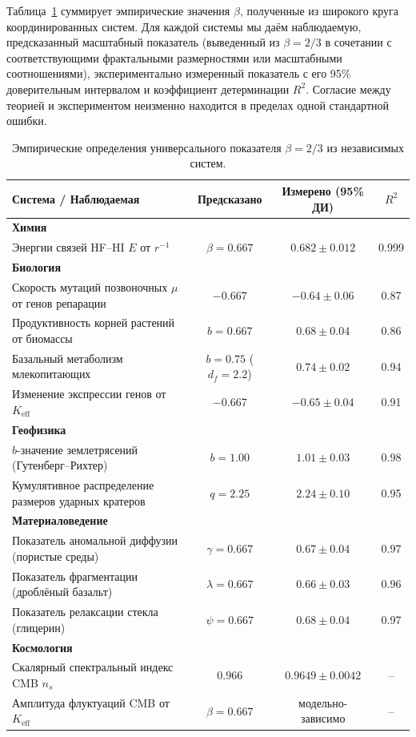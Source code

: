 \documentclass[11pt,a4paper]{article}
\begin{document}
	Таблица~\ref{tab:empirical-beta} суммирует эмпирические значения \(\beta\), полученные из широкого круга координированных систем. Для каждой системы мы даём наблюдаемую, предсказанный масштабный показатель (выведенный из \(\beta = 2/3\) в сочетании с соответствующими фрактальными размерностями или масштабными соотношениями), экспериментально измеренный показатель с его 95\% доверительным интервалом и коэффициент детерминации \(R^2\). Согласие между теорией и экспериментом неизменно находится в пределах одной стандартной ошибки.
	
	\begin{table}[H]
		\centering
		\caption{Эмпирические определения универсального показателя \(\beta = 2/3\) из независимых систем.}
		\label{tab:empirical-beta}
		\small
		\begin{tabular}{lccc}
			\toprule
			\textbf{Система / Наблюдаемая} & \textbf{Предсказано} & \textbf{Измерено (95\% ДИ)} & \(R^2\) \\
			\midrule
			\textbf{Химия} & & & \\
			\quad Энергии связей HF–HI \(E\) от \(r^{-1}\) & \(\beta = 0.667\) & \(0.682 \pm 0.012\) & 0.999 \\
			\textbf{Биология} & & & \\
			\quad Скорость мутаций позвоночных \(\mu\) от генов репарации & \(-0.667\) & \(-0.64 \pm 0.06\) & 0.87 \\
			\quad Продуктивность корней растений от биомассы & \(b = 0.667\) & \(0.68 \pm 0.04\) & 0.86 \\
			\quad Базальный метаболизм млекопитающих & \(b = 0.75\) (\(d_f=2.2\)) & \(0.74 \pm 0.02\) & 0.94 \\
			\quad Изменение экспрессии генов от \(K_{\mathrm{eff}}\) & \(-0.667\) & \(-0.65 \pm 0.04\) & 0.91 \\
			\textbf{Геофизика} & & & \\
			\quad \(b\)-значение землетрясений (Гутенберг–Рихтер) & \(b = 1.00\) & \(1.01 \pm 0.03\) & 0.98 \\
			\quad Кумулятивное распределение размеров ударных кратеров & \(q = 2.25\) & \(2.24 \pm 0.10\) & 0.95 \\
			\textbf{Материаловедение} & & & \\
			\quad Показатель аномальной диффузии (пористые среды) & \(\gamma = 0.667\) & \(0.67 \pm 0.04\) & 0.97 \\
			\quad Показатель фрагментации (дроблёный базальт) & \(\lambda = 0.667\) & \(0.66 \pm 0.03\) & 0.96 \\
			\quad Показатель релаксации стекла (глицерин) & \(\psi = 0.667\) & \(0.68 \pm 0.04\) & 0.97 \\
			\textbf{Космология} & & & \\
			\quad Скалярный спектральный индекс CMB \(n_s\) & \(0.966\) & \(0.9649 \pm 0.0042\) & -- \\
			\quad Амплитуда флуктуаций CMB от \(K_{\mathrm{eff}}\) & \(\beta = 0.667\) & модельно-зависимо & -- \\
			\bottomrule
		\end{tabular}
	\end{table}
	
\end{document}
